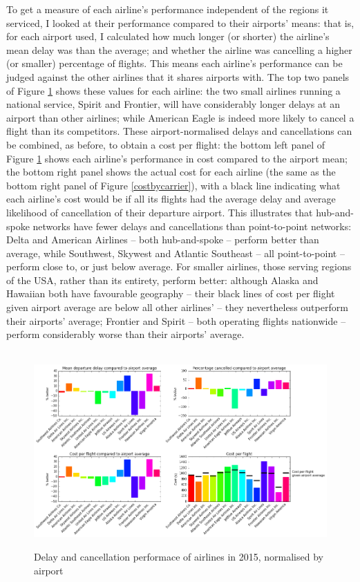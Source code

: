 \documentclass[a4paper]{article}
\begin{document}
To get a measure of each airline's performance independent of the regions it serviced, I looked at their performance compared to their airports' means: that is, for each airport used, I calculated how much longer (or shorter) the airline's mean delay was than the average; and whether the airline was cancelling a higher (or smaller) percentage of flights. This means each airline's performance can be judged against the other airlines that it shares airports with. The top two panels of Figure \ref{normalisedcostbycarrier} shows these values for each airline: the two small airlines running a national service, Spirit and Frontier, will have considerably longer delays at an airport than other airlines; while American Eagle is indeed more likely to cancel a flight than its competitors. These airport-normalised delays and cancellations can be combined, as before, to obtain a cost per flight: the bottom left panel of Figure \ref{normalisedcostbycarrier} shows each airline's performance in cost compared to the airport mean; the bottom right panel shows the actual cost for each airline (the same as the bottom right panel of Figure \ref{costbycarrier}), with a black line indicating what each airline's cost would be if all its flights had the average delay and average likelihood of cancellation of their departure airport. This illustrates that hub-and-spoke networks have fewer delays and cancellations than point-to-point networks: Delta and American Airlines -- both hub-and-spoke -- perform better than average, while Southwest, Skywest and Atlantic Southeast -- all point-to-point -- perform close to, or just below average. For smaller airlines, those serving regions of the USA, rather than its entirety, perform better: although Alaska and Hawaiian both have favourable geography -- their black lines of cost per flight given airport average are below all other airlines' -- they nevertheless outperform their airports' average; Frontier and Spirit -- both operating flights nationwide -- perform considerably worse than their airports' average.

\begin{figure}[h]
\centering
\hbox{\hspace{-0.5in}
\includegraphics[width=1.2\textwidth]{../figures/exploration/normalised_cost_carrier.png}}
\caption{Delay and cancellation performace of airlines in 2015, normalised by airport}
\label{normalisedcostbycarrier}
\end{figure}
\end{document}
